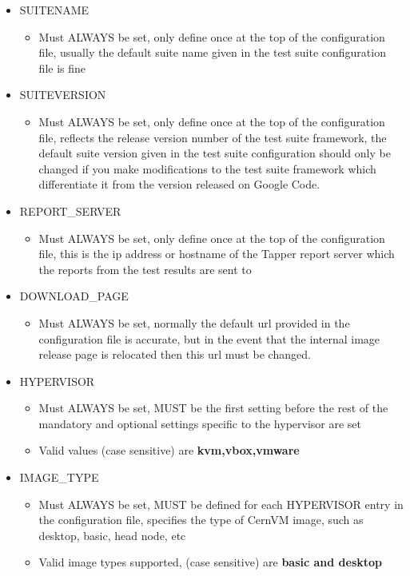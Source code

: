 \begin{itemize}
\item	SUITENAME
		\begin{itemize}
		\item	Must ALWAYS be set, only define once at the top of the configuration file, 
	  		  	usually the default suite name given in the test suite configuration file is fine
		\end{itemize}
	  		  
\item	SUITEVERSION
		\begin{itemize}
		\item	Must ALWAYS be set, only define once at the top of the configuration file,
	  		  	reflects the release version number of the test suite framework, the default 
      		  	suite version given in the test suite configuration should only be changed if 
     		  	you make modifications to the test suite framework which differentiate it from
      		  	the version released on Google Code.
		\end{itemize}

\item	REPORT\_SERVER
		\begin{itemize}
		\item	Must ALWAYS be set, only define once at the top of the configuration file,
      			this is the ip address or hostname of the Tapper report server which the reports
      			from the test results are sent to
		\end{itemize}
		
\item	DOWNLOAD\_PAGE
		\begin{itemize}
		\item	Must ALWAYS be set, normally the default url provided in the configuration file is
				accurate, but in the event that the internal \cernvm image release page is relocated
				then this url must be changed.
		\end{itemize}

\item	HYPERVISOR
		\begin{itemize}
		\item	Must ALWAYS be set, MUST be the first setting before the rest of the mandatory
	  			and optional settings specific to the hypervisor are set
	  	\item	Valid values (case sensitive) are {\bf kvm,vbox,vmware}
		\end{itemize}
		
\item	IMAGE\_TYPE
		\begin{itemize}
		\item	Must ALWAYS be set,  MUST be defined for each HYPERVISOR entry in the configuration
				file, specifies the type of CernVM image, such as desktop, basic, head node, etc
		\item	Valid image types supported, (case sensitive) are {\bf basic and desktop}
		\end{itemize}
		

\end{itemize}
